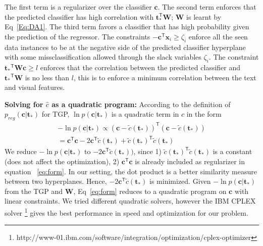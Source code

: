 The first term is a regularizer over the classifier $\mathbf{c}$.  The second term enforces that the predicted classifier has high correlation with $\mathbf{t}_*^\textsf{T} \mathbf{W}$; $\mathbf{W}$ is learnt by Eq~\ref{Eq:DA1}. The third term favors a classifier that has high probability given the prediction of the regressor. The constraints $ -\mathbf{c}^\textsf{T} {\mathbf{x}}_{i} \geq \zeta_i $  enforce all the seen data instances to be at the negative side of the predicted classifier hyperplane with some missclassification allowed through the  slack variables $ \zeta_i$. The constraint $ {\mathbf{t}_*}^\textsf{T} \mathbf{W} \mathbf{c} \geq l$ enforces that the correlation between the predicted classifier and ${\mathbf{t}_*}^\textsf{T} \mathbf{W}$ is no less than $l$, this is to enforce a minimum correlation between the text and visual features. 







\textbf{Solving for $\hat{c}$ as a quadratic program: }
According to  the definition of $p_{reg}(\mathbf{c}|\mathbf{t}_*)$ for  TGP,  $\ln p(\mathbf{c}|\mathbf{t}_*)$ is a quadratic term in $c$ in the form  
\begin{equation}
\begin{split}
-\ln p(\mathbf{c}|\mathbf{t}_*) \propto ( \mathbf{c} - \tilde{c}(\mathbf{t}_*))^\textsf{T} (\mathbf{c} - \tilde{c}(\mathbf{t}_*)) \\= \mathbf{c}^\textsf{T} \mathbf{c} -2 \mathbf{c}^\textsf{T} \tilde{c}(\mathbf{t}_*) +  \tilde{c}(\mathbf{t}_*)^\textsf{T} \tilde{c}(\mathbf{t}_*) 
\end{split}
\label{eq:lnptgp}
\end{equation}
We reduce $-\ln p(\mathbf{c}|\mathbf{t}_*)$ to $-2 \mathbf{c}^\textsf{T} \tilde{c}(\mathbf{t}_*))$, since 1) $\tilde{c}(\mathbf{t}_*)^\textsf{T} \tilde{c}(\mathbf{t}_*)$ is a constant (\ie does not affect the optimization), 2) $\mathbf{c}^\textsf{T} \mathbf{c}$ is already included as regularizer in equation ~\ref{eq:form}.  In our setting, the dot product  is a better similarity measure between two hyperplanes. Hence,  $-2 \mathbf{c}^\textsf{T} \tilde{c}(\mathbf{t}_*)$ is minimized.
Given $-\ln p(\mathbf{c}|\mathbf{t}_*)$ from the TGP and  $\mathbf{W}$, Eq~\ref{eq:form} reduces to a quadratic program on $\mathbf{c}$ with linear constraints. We tried different quadratic solvers, however the IBM CPLEX solver \footnote{http://www-01.ibm.com/software/integration/optimization/cplex-optimizer} gives the best performance in speed and optimization for our problem.


